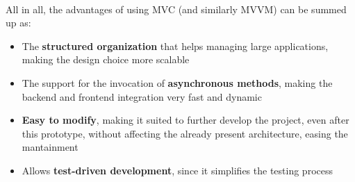 \documentclass[table, 12pt]{article}
\begin{document}
\paragraph{}
All in all, the advantages of using MVC (and similarly MVVM) can be summed up as: 
\begin{itemize}
    \item The \textbf{structured organization} that helps managing large applications, making the design choice more scalable
    \item The support for the invocation of \textbf{asynchronous methods}, making the backend and frontend integration very fast and dynamic
    \item \textbf{Easy to modify}, making it suited to further develop the project, even after this prototype, without affecting the already present architecture, easing the mantainment
    \item Allows \textbf{test-driven development}, since it simplifies the testing process
\end{itemize}
\end{document}
